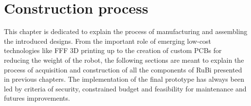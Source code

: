 \chapter{Construction process} %
\label{cha:implementation}
This chapter is dedicated to explain the process of manufacturing and assembling the introduced designs.
From the important role of emerging low-cost technologies like FFF 3D printing up to the creation of custom PCBs for reducing the weight of the robot, the following sections are meant to explain the process of acquisition and construction of all the components of RuBi presented in previous chapters.
The implementation of the final prototype has always been led by criteria of security, constrained budget and feasibility for maintenance and futures improvements.






%

